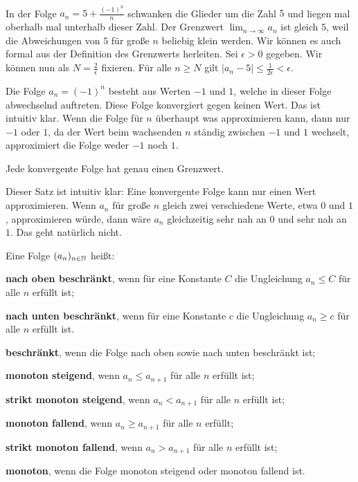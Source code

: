 \begin{bsp} {\ } 
	\begin{enuma} 
		\item In der Folge $a_n = 5 + \frac{(-1)^n}{n}$ schwanken die Glieder um die Zahl $5$ und liegen mal oberhalb mal unterhalb dieser Zahl. Der Grenzwert $\lim_{n \to \infty} a_n$ ist gleich $5$, weil die Abweichungen von $5$ für große $n$ beliebig klein werden. Wir können es auch formal aus der Definition des Grenzwerts herleiten. Sei $\epsilon>0$ gegeben. Wir können nun als $N = \frac{2}{ \epsilon}$ fixieren. Für alle $n \ge N$ gilt $|a_n - 5|  \le \frac{1}{2 \epsilon} < \epsilon$. 
		\item Die Folge $a_n = (-1)^n$ besteht aus Werten $-1$ und $1$, welche in dieser Folge abwechselnd auftreten. Diese Folge konvergiert gegen keinen Wert. Das ist intuitiv klar. Wenn die Folge für $n$ überhaupt was approximieren kann, dann nur $-1$ oder $1$, da der Wert beim wachsenden $n$ ständig zwischen $-1$ und $1$ wechselt, approximiert die Folge weder $-1$ noch $1$. 
	\end{enuma} 
\end{bsp} 

\begin{thm} 
	Jede konvergente Folge hat genau einen Grenzwert. 
\end{thm} 

\begin{bem} Dieser Satz ist intuitiv klar: Eine konvergente Folge kann nur einen Wert approximieren. Wenn $a_n$ für große $n$ gleich zwei verschiedene Werte, etwa $0$ und $1$, approximieren würde, dann wäre $a_n$ gleichzeitig sehr nah an $0$ und sehr nah an $1$. Das geht natürlich nicht. 
\end{bem} 

\begin{defn} Eine Folge $(a_n)_{n \in \mathbb{N}}$ heißt: 
	\begin{enuma}
		\item \textbf{nach oben beschränkt}, wenn für eine Konstante $C$ die Ungleichung $a_n \le C$ für alle $n$ erfüllt ist;
		\item \textbf{nach unten beschränkt}, wenn für eine Konstante $c$ die Ungleichung $a_n \ge c$ für alle $n$ erfüllt ist. 
		\item \textbf{beschränkt}, wenn die Folge nach oben sowie nach unten beschränkt ist; 
		\item \textbf{monoton steigend}, wenn $a_n \le a_{n+1}$ für alle $n$ erfüllt ist;
		\item \textbf{strikt monoton steigend}, wenn $a_n < a_{n+1}$ für alle $n$ erfüllt ist;
		\item \textbf{monoton fallend}, wenn $a_n \ge a_{n+1}$ für alle $n$ erfüllt; 
		\item \textbf{strikt monoton fallend}, wenn $a_n > a_{n+1}$ für alle $n$ erfüllt ist; 
		\item \textbf{monoton}, wenn die Folge monoton steigend oder monoton fallend ist. 
	\end{enuma} 
\end{defn} 

